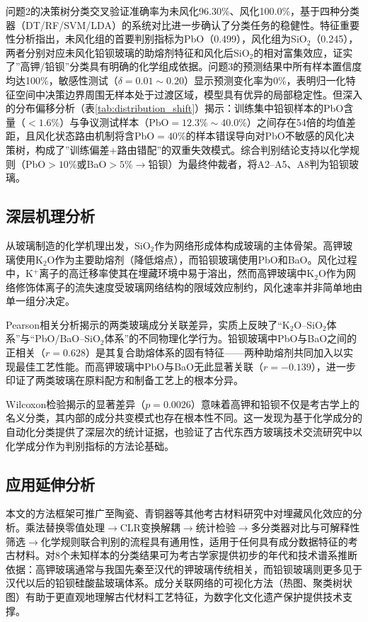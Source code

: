 \documentclass[12pt,a4paper]{ctexart}
\begin{document}
问题2的决策树分类交叉验证准确率为未风化96.30\%、风化100.0\%，基于四种分类器（DT/RF/SVM/LDA）的系统对比进一步确认了分类任务的稳健性。特征重要性分析指出，未风化组的首要判别指标为PbO（0.499），风化组为SiO$_2$（0.245），两者分别对应未风化铅钡玻璃的助熔剂特征和风化后SiO$_2$的相对富集效应，证实了”高钾/铅钡”分类具有明确的化学组成依据。问题3的预测结果中所有样本置信度均达100\%，敏感性测试（$\delta=0.01\sim0.20$）显示预测变化率为0\%，表明归一化特征空间中决策边界周围无样本处于过渡区域，模型具有优异的局部稳定性。但深入的分布偏移分析（表\ref{tab:distribution_shift}）揭示：训练集中铅钡样本的PbO含量（$<1.6\%$）与争议测试样本（PbO$=12.3\%\sim40.0\%$）之间存在54倍的均值差距，且风化状态路由机制将含PbO$=40\%$的样本错误导向对PbO不敏感的风化决策树，构成了”训练偏差+路由错配”的双重失效模式。综合判别结论支持以化学规则（PbO$>10\%$或BaO$>5\%\rightarrow$铅钡）为最终仲裁者，将A2--A5、A8判为铅钡玻璃。

\subsection{深层机理分析}

从玻璃制造的化学机理出发，SiO$_2$作为网络形成体构成玻璃的主体骨架。高钾玻璃使用K$_2$O作为主要助熔剂（降低熔点），而铅钡玻璃使用PbO和BaO。风化过程中，K$^+$离子的高迁移率使其在埋藏环境中易于溶出，然而高钾玻璃中K$_2$O作为网络修饰体离子的流失速度受玻璃网络结构的限域效应制约\cite{3}，风化速率并非简单地由单一组分决定。

Pearson相关分析揭示的两类玻璃成分关联差异，实质上反映了“K$_2$O--SiO$_2$体系”与“PbO/BaO--SiO$_2$体系”的不同物理化学行为。铅钡玻璃中PbO与BaO之间的正相关（$r=0.628$）是其复合助熔体系的固有特征——两种助熔剂共同加入以实现最佳工艺性能。而高钾玻璃中PbO与BaO无此显著关联（$r=-0.139$），进一步印证了两类玻璃在原料配方和制备工艺上的根本分异\cite{1}。

Wilcoxon检验揭示的显著差异（$p=0.0026$）意味着高钾和铅钡不仅是考古学上的名义分类，其内部的成分共变模式也存在根本性不同。这一发现为基于化学成分的自动化分类提供了深层次的统计证据，也验证了古代东西方玻璃技术交流研究中以化学成分作为判别指标的方法论基础\cite{9}。

\subsection{应用延伸分析}

本文的方法框架可推广至陶瓷、青铜器等其他考古材料研究中对埋藏风化效应的分析。乘法替换零值处理$\rightarrow$CLR变换解耦$\rightarrow$统计检验$\rightarrow$多分类器对比与可解释性筛选$\rightarrow$化学规则联合判别的流程具有通用性，适用于任何具有成分数据特征的考古材料。对8个未知样本的分类结果可为考古学家提供初步的年代和技术谱系推断依据：高钾玻璃通常与我国先秦至汉代的钾玻璃传统相关，而铅钡玻璃则更多见于汉代以后的铅钡硅酸盐玻璃体系。成分关联网络的可视化方法（热图、聚类树状图）有助于更直观地理解古代材料工艺特征，为数字化文化遗产保护提供技术支撑。
\end{document}
